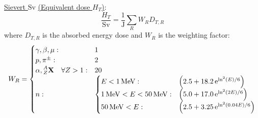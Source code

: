		\href{https://en.wikipedia.org/wiki/Sievert}{Sievert $\mathrm{Sv}$} \href{https://en.wikipedia.org/wiki/Equivalent_dose}{(Equivalent dose $H_T$)}:
		\begin{equation}
			\frac{H_T}{\mathrm{Sv}} = \frac{1}{\mathrm{J}}\sum_R W_R D_{T,R}			
		\end{equation}
		where $D_{T,R}$ is the absorbed energy dose and $W_R$ is the weighting factor:
		\begin{equation}
			\begin{aligned}
				W_R =
				\begin{cases}
					\gamma,\beta,\mu: & 1 \\
					p, \pi^\pm: & 2 \\
					\alpha, \prescript{A}{Z}{\mathbf{X}}\quad\forall Z>1: & 20 \\
					n: &\begin{cases}
						E<1\,\mathrm{MeV}: & \qty(2.5+18.2 \,\mathrm{e}^{\ln^2(E)/6}) \\
						1\,\mathrm{MeV} <E<50\,\mathrm{MeV}: & \qty(5.0+17.0 \,\mathrm{e}^{\ln^2(2E)/6}) \\
						50\,\mathrm{MeV}<E: & \qty(2.5+3.25 \,\mathrm{e}^{\ln^2(0.04E)/6}) \\
					\end{cases}
				\end{cases}\\
			\end{aligned}
		\end{equation}
